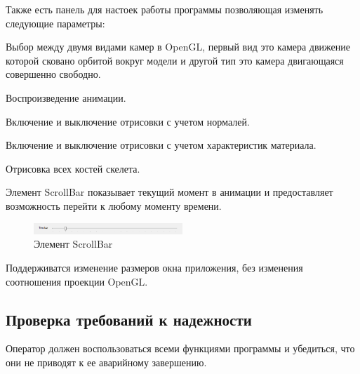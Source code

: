 Также есть панель для настоек работы программы позволяющая изменять следующие параметры:
\begin{my_enumerate}
\item Выбор между двумя видами камер в OpenGL, первый вид это камера движение которой сковано орбитой вокруг модели и другой тип это камера двигающаяся совершенно свободно.
\item Воспроизведение анимации.
\item Включение и выключение отрисовки с учетом нормалей.
\item Включение и выключение отрисовки с учетом характеристик материала.
\item Отрисовка всех костей скелета.
\end{my_enumerate}

Элемент ScrollBar показывает текущий момент в анимации и предоставляет 
возможность перейти к любому моменту времени. 

\begin{figure}[h!]
    \centering
    \includegraphics[width=0.5\textwidth]{../screenshots/time_bar.png}
    \caption{Элемент ScrollBar}
\end{figure}

\bigskip

Поддерживатся изменение размеров окна приложения, без изменения соотношения проекции OpenGL.


\subsection{Проверка требований к надежности}
Оператор должен воспользоваться всеми функциями программы и убедиться, что они не приводят к ее аварийному завершению.

